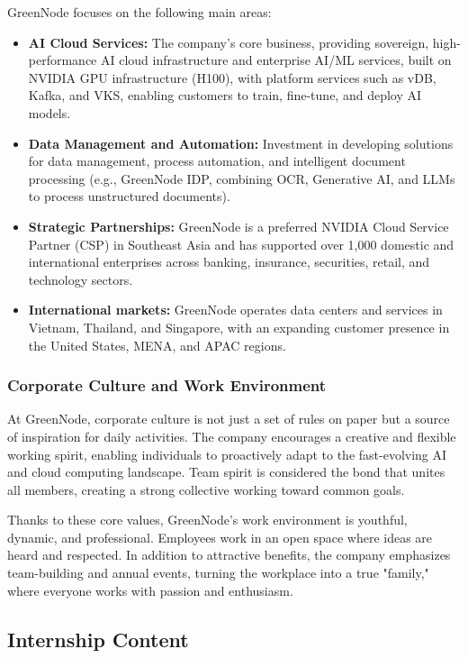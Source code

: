 GreenNode focuses on the following main areas:
\begin{itemize}
    \item \textbf{AI Cloud Services:} The company's core business, providing sovereign, high-performance AI cloud infrastructure and enterprise AI/ML services, built on NVIDIA GPU infrastructure (H100), with platform services such as vDB, Kafka, and VKS, enabling customers to train, fine-tune, and deploy AI models.

    \item \textbf{Data Management and Automation:} Investment in developing solutions for data management, process automation, and intelligent document processing (e.g., GreenNode IDP, combining OCR, Generative AI, and LLMs to process unstructured documents).

    \item \textbf{Strategic Partnerships:} GreenNode is a preferred NVIDIA Cloud Service Partner (CSP) in Southeast Asia and has supported over 1,000 domestic and international enterprises across banking, insurance, securities, retail, and technology sectors.

    \item \textbf{International markets:} GreenNode operates data centers and services in Vietnam, Thailand, and Singapore, with an expanding customer presence in the United States, MENA, and APAC regions.
\end{itemize}

\subsubsection{Corporate Culture and Work Environment}

At GreenNode, corporate culture is not just a set of rules on paper but a source of inspiration for daily activities. The company encourages a creative and flexible working spirit, enabling individuals to proactively adapt to the fast-evolving AI and cloud computing landscape. Team spirit is considered the bond that unites all members, creating a strong collective working toward common goals.

Thanks to these core values, GreenNode's work environment is youthful, dynamic, and professional. Employees work in an open space where ideas are heard and respected. In addition to attractive benefits, the company emphasizes team-building and annual events, turning the workplace into a true "family," where everyone works with passion and enthusiasm.
\subsection{Internship Content}

